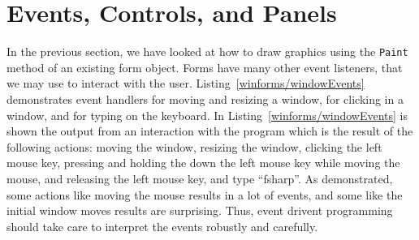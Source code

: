 \section{Events, Controls, and Panels}
In the previous section, we have looked at how to draw graphics using the \lstinline!Paint! method of an existing form object. Forms have many other event listeners, that we may use to interact with the user. Listing~\ref{winforms/windowEvents} demonstrates event handlers for moving and resizing a window, for clicking in a window, and for typing on the keyboard.
%
%
%
In Listing~\ref{winforms/windowEvents} is shown the output from an interaction with the program which is the result of the following actions: moving the window, resizing the window, clicking the left mouse key, pressing and holding the down the left mouse key while moving the mouse, and releasing the left mouse key, and type ``fsharp''. As demonstrated, some actions like moving the mouse results in a lot of events, and some like the initial window moves results are surprising. Thus, event drivent programming should take care to interpret the events robustly and carefully.

